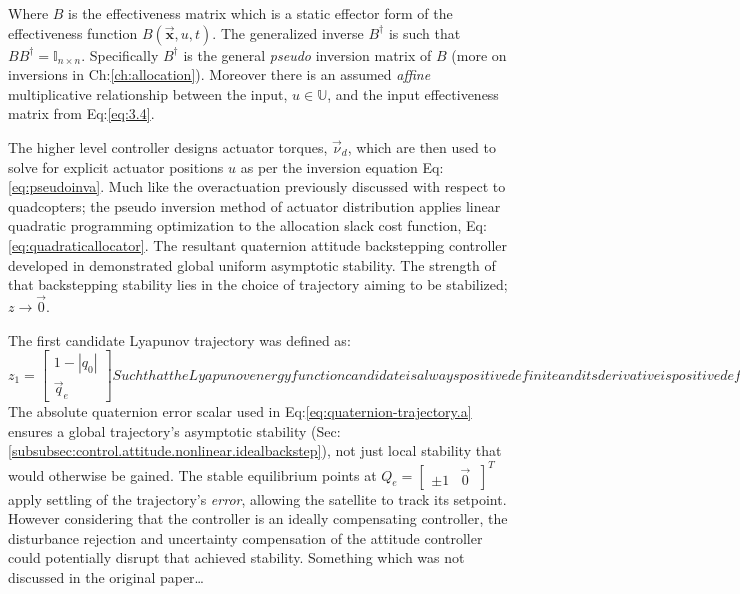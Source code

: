 Where $B$ is the effectiveness matrix which is a static effector form of the effectiveness function $B(\vec{\mathbf{x}},u,t)$. The generalized inverse $B^{\dagger}$ is such that $BB^{\dagger}=\mathbb{I}_{n\times n}$. Specifically $B^{\dagger}$ is the general \emph{pseudo} inversion matrix of $B$ (more on inversions in Ch:\ref{ch:allocation}). Moreover there is an assumed \emph{affine} multiplicative relationship between the input, $u\in\mathbb{U}$, and the input effectiveness matrix from Eq:\ref{eq:3.4}. 
\par
The higher level controller designs actuator torques, $\vec{\nu}_d$, which are then used to solve for explicit actuator positions $u$ as per the inversion equation Eq:\ref{eq:pseudoinva}. Much like the overactuation previously discussed with respect to quadcopters; the pseudo inversion method of actuator distribution applies linear quadratic programming optimization to the allocation slack cost function, Eq:\ref{eq:quadraticallocator}. The resultant quaternion attitude backstepping controller developed in \cite{satellitebackstepping} demonstrated global uniform asymptotic stability. The strength of that backstepping stability lies in the choice of trajectory aiming to be stabilized; $z\rightarrow\vec{0}$. 
\par
The first candidate Lyapunov trajectory was defined as:
\begin{subequations}
\begin{equation}\label{eq:quaternion-trajectory.a}
z_1=\begin{bmatrix}
1-|q_0|\\
\vec{q}_e
\end{bmatrix}
\end{equation}
Such that the Lyapunov energy function candidate is always positive definite and its derivative is positive definite descrescent. The particulars of that stability proof are omitted but it is worth detailing their chosen candidate function:
\begin{equation}
V_1(z)=z_1\text{}^Tz_1>0~~~~\forall[q_0,\vec{q}_e]
\end{equation}
\end{subequations}
The absolute quaternion error scalar used in Eq:\ref{eq:quaternion-trajectory.a} ensures a global trajectory's asymptotic stability (Sec:\ref{subsubsec:control.attitude.nonlinear.idealbackstep}), not just local stability that would otherwise be gained. The stable equilibrium points at $Q_e=\begin{bmatrix}
\pm 1 & \vec{0}~
\end{bmatrix}^T$ apply settling of the trajectory's \emph{error}, allowing the satellite to track its setpoint. However considering that the controller is an ideally compensating controller, the disturbance rejection and uncertainty compensation of the attitude controller could potentially disrupt that achieved stability. Something which was not discussed in the original paper\ldots